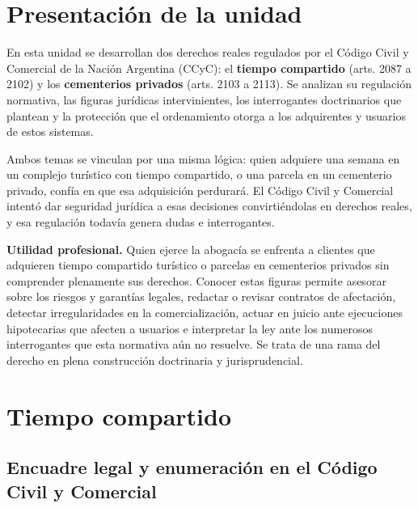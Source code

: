 \documentclass[12pt,oneside]{book}
\begin{document}
\chapter*{Presentación de la unidad}

En esta unidad se desarrollan dos derechos reales regulados por el Código Civil y Comercial de la Nación Argentina (CCyC): el \textbf{tiempo compartido} (arts. 2087 a 2102) y los \textbf{cementerios privados} (arts. 2103 a 2113). Se analizan su regulación normativa, las figuras jurídicas intervinientes, los interrogantes doctrinarios que plantean y la protección que el ordenamiento otorga a los adquirentes y usuarios de estos sistemas.

Ambos temas se vinculan por una misma lógica: quien adquiere una semana en un complejo turístico con tiempo compartido, o una parcela en un cementerio privado, confía en que esa adquisición perdurará. El Código Civil y Comercial intentó dar seguridad jurídica a esas decisiones convirtiéndolas en derechos reales, y esa regulación todavía genera dudas e interrogantes.

\begin{note}
\textbf{Utilidad profesional.} Quien ejerce la abogacía se enfrenta a clientes que adquieren tiempo compartido turístico o parcelas en cementerios privados sin comprender plenamente sus derechos. Conocer estas figuras permite asesorar sobre los riesgos y garantías legales, redactar o revisar contratos de afectación, detectar irregularidades en la comercialización, actuar en juicio ante ejecuciones hipotecarias que afecten a usuarios e interpretar la ley ante los numerosos interrogantes que esta normativa aún no resuelve. Se trata de una rama del derecho en plena construcción doctrinaria y jurisprudencial.
\end{note}

\chapter{Tiempo compartido}

\section{Encuadre legal y enumeración en el Código Civil y Comercial}
\end{document}
